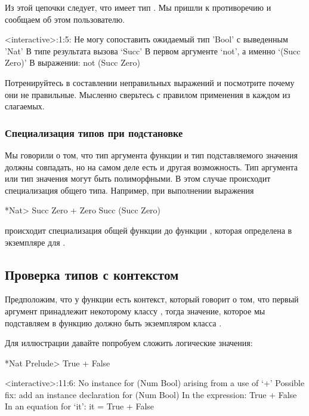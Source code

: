 Из этой цепочки следует, что  имеет тип .
Мы пришли к противоречию и сообщаем об этом пользователю.

\begin{code}
<interactive>:1:5:
    Не могу сопоставить ожидаемый тип 'Bool' с выведенным 'Nat'
    В типе результата вызова `Succ'
	В первом аргументе `not', а именно `(Succ Zero)'
    В выражении: not (Succ Zero)	
\end{code}

Потренируйтесь в составлении неправильных выражений
и посмотрите почему они не правильные. Мысленно сверьтесь с
правилом применения в каждом из слагаемых.

\subsubsection{Специализация типов при подстановке}

Мы говорили о том, что тип аргумента функции и тип подставляемого
значения должны совпадать, но на самом деле есть и другая
возможность. Тип аргумента или тип значения могут быть 
полиморфными. В этом случае происходит специализация 
общего типа. Например, при выполнении выражения

\begin{code}
*Nat> Succ Zero + Zero
Succ (Succ Zero)
\end{code}

\noindent происходит специализация общей 
функции 
до функции , которая определена 
в экземпляре  для .

\subsection{Проверка типов с контекстом}

Предположим, что у функции  есть контекст, который
говорит о том, что первый аргумент принадлежит некоторому
классу ,  тогда значение, которое
мы подставляем в функцию должно быть экземпляром класса .

Для иллюстрации давайте попробуем сложить логические значения:

\begin{code}
*Nat Prelude> True + False

<interactive>:11:6:
    No instance for (Num Bool)
      arising from a use of `+'
    Possible fix: add an instance declaration for (Num Bool)
    In the expression: True + False
    In an equation for `it': it = True + False
\end{code}

